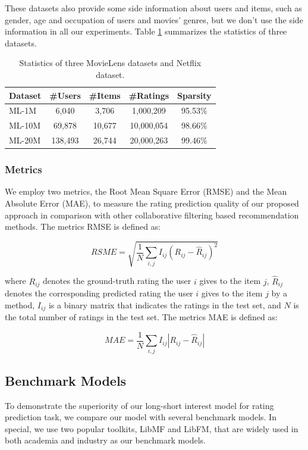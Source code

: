 \documentclass{llncs}
\begin{document}
These datasets also provide some side information about users and items,
such as gender, age and occupation of users and movies' genres,
but we don't use the side information in all our experiments.
Table \ref{tab:statistics} summarizes the statistics of three datasets.

\begin{table}[htbp]
	\centering
	\caption{Statistics of three MovieLens datasets and Netflix dataset.}
	\label{tab:statistics}
	\begin{tabular}{|l|c|c|c|c|}
		\hline
		\textbf{Dataset} & \textbf{\#Users} & \textbf{\#Items} & \textbf{\#Ratings} & \textbf{Sparsity} \\
		\hline
		ML-1M  & 6,040    & 3,706  & 1,000,209   & 95.53\% \\
		ML-10M & 69,878   & 10,677 & 10,000,054  & 98.66\% \\
		ML-20M & 138,493  & 26,744 & 20,000,263  & 99.46\% \\
		\hline
	\end{tabular}
\end{table}

\subsubsection{Metrics}
We employ two metrics, the Root Mean Square Error (RMSE) and the Mean Absolute Error (MAE),
to measure the rating prediction quality of our proposed approach in comparison with other
collaborative filtering based recommendation methods.
The metrics RMSE is defined as:

\begin{equation}
RSME = \sqrt{ \frac{1}{N} \sum_{i,j} I_{ij} (R_{ij} - \hat{R}_{ij})^2 }
\end{equation}

where $R_{ij}$ denotes the ground-truth rating the user $i$ gives to the item $j$,
$\hat{R}_{ij}$ denotes the corresponding predicted rating the user $i$ gives to
the item $j$ by a method, $I_{ij}$ is a binary matrix that indicates the ratings
in the test set, and $N$ is the total number of ratings in the test set.
The metrics MAE is defined as:

\begin{equation}
MAE = \frac{1}{N} \sum_{i,j} I_{ij} |R_{ij} - \hat{R}_{ij}|
\end{equation}

\subsection{Benchmark Models}
To demonstrate the superiority of our long-short interest model for rating prediction task,
we compare our model with several benchmark models.
In special, we use two popular toolkits, LibMF and LibFM, that are
widely used in both academia and industry as our benchmark models.
\end{document}
